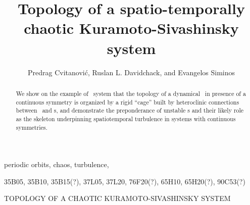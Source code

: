 \documentclass{siamltex}
\begin{document}
                \title{
Topology of a spatio-temporally chaotic Kuramoto-Sivashinsky system
                 }
                  \author{
Predrag Cvitanovi\'c\footnotemark[1],
Ruslan L. Davidchack\footnotemark[2],
    and
Evangelos Siminos\footnotemark[1]
                    }
                  

                \maketitle

\renewcommand{\thefootnote}{\fnsymbol{footnote}}
\renewcommand{\thefootnote}{\arabic{footnote}}
  
                \begin{abstract}
We show on the example of \KS\ system
that the topology of a dynamical \statesp\ in presence of 
a continuous symmetry is organized by 
a rigid ``cage'' built by heteroclinic connections
between \eqva\ and \rpo s, and demonstrate the
preponderance of unstable \rpo s and their likely
role as the skeleton underpinning spatiotemporal turbulence in
systems with continuous symmetries. 
                \end{abstract}

\begin{keywords}
periodic orbits, chaos, turbulence, {\KSe}
\end{keywords}

\begin{AMS}
35B05, 35B10, 35B15(?), 37L05, 37L20, 76F20(?), 65H10, 65H20(?), 90C53(?)
\end{AMS}

\pagestyle{myheadings}
\thispagestyle{plain}
         {TOPOLOGY OF A CHAOTIC KURAMOTO-SIVASHINSKY SYSTEM}
\end{document}
